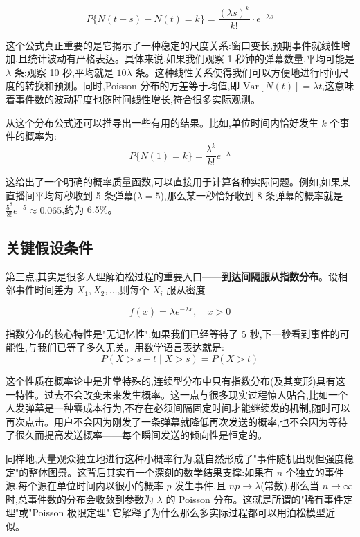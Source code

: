 \documentclass[12pt,a4paper]{article}
\begin{document}
\begin{equation}
P\{N(t+s)-N(t)=k\} = \frac{(\lambda s)^k}{k!} \cdot e^{-\lambda s}
\end{equation}

这个公式真正重要的是它揭示了一种稳定的尺度关系:窗口变长,预期事件就线性增加,且统计波动有严格表达。具体来说,如果我们观察 1 秒钟的弹幕数量,平均可能是 $\lambda$ 条;观察 10 秒,平均就是 $10\lambda$ 条。这种线性关系使得我们可以方便地进行时间尺度的转换和预测。同时,Poisson 分布的方差等于均值,即 $\text{Var}[N(t)] = \lambda t$,这意味着事件数的波动程度也随时间线性增长,符合很多实际观测。

从这个分布公式还可以推导出一些有用的结果。比如,单位时间内恰好发生 $k$ 个事件的概率为:
\begin{equation}
P\{N(1) = k\} = \frac{\lambda^k}{k!} e^{-\lambda}
\end{equation}

这给出了一个明确的概率质量函数,可以直接用于计算各种实际问题。例如,如果某直播间平均每秒收到 5 条弹幕($\lambda = 5$),那么某一秒恰好收到 8 条弹幕的概率就是 $\frac{5^8}{8!}e^{-5} \approx 0.065$,约为 6.5\%。

\subsection{关键假设条件}

第三点,其实是很多人理解泊松过程的重要入口——\textbf{到达间隔服从指数分布}。设相邻事件时间差为 $X_1,X_2,\ldots$,则每个 $X_i$ 服从密度

\begin{equation}
f(x) = \lambda e^{-\lambda x}, \quad x>0
\end{equation}

指数分布的核心特性是"无记忆性":如果我们已经等待了 5 秒,下一秒看到事件的可能性,与我们已等了多久无关。用数学语言表达就是:
\begin{equation}
P(X > s+t \mid X > s) = P(X > t)
\end{equation}

这个性质在概率论中是非常特殊的,连续型分布中只有指数分布(及其变形)具有这一特性。过去不会改变未来发生概率。这一点与很多现实过程惊人贴合,比如一个人发弹幕是一种零成本行为,不存在必须间隔固定时间才能继续发的机制,随时可以再次点击。用户不会因为刚发了一条弹幕就降低再次发送的概率,也不会因为等待了很久而提高发送概率——每个瞬间发送的倾向性是恒定的。

同样地,大量观众独立地进行这种小概率行为,就自然形成了"事件随机出现但强度稳定"的整体图景。这背后其实有一个深刻的数学结果支撑:如果有 $n$ 个独立的事件源,每个源在单位时间内以很小的概率 $p$ 发生事件,且 $np \to \lambda$(常数),那么当 $n \to \infty$ 时,总事件数的分布会收敛到参数为 $\lambda$ 的 Poisson 分布。这就是所谓的"稀有事件定理"或"Poisson 极限定理",它解释了为什么那么多实际过程都可以用泊松模型近似。
\end{document}
